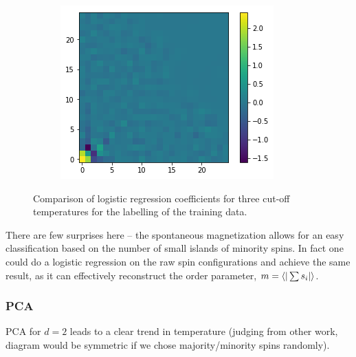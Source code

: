 \documentclass[11pt]{article}
\begin{document}
\begin{figure}[h]
\begin{subfigure}{0.3\textwidth}
		\centering
		\includegraphics[width=\textwidth]{ising_images/logreg_2d_2519}
	\end{subfigure}
	\caption{Comparison of logistic regression coefficients for three cut-off temperatures for the labelling of the training data.}
\end{figure}

There are few surprises here -- the spontaneous magnetization allows for an easy classification based on the number of small islands of minority spins. In fact one could do a logistic regression on the raw spin configurations and achieve the same result, as it can effectively reconstruct the order parameter, $m=\ev{|\sum s_i|}$.

\subsubsection{PCA}
PCA for $d=2$ leads to a clear trend in temperature (judging from other work, diagram would be symmetric if we chose majority/minority spins randomly).
\end{document}
